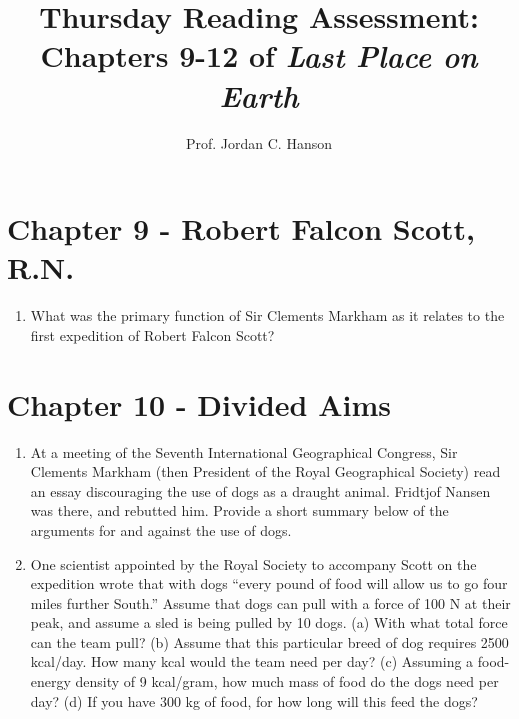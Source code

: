 \documentclass{article}
\begin{document}
\title{Thursday Reading Assessment: Chapters 9-12 of \textit{Last Place on Earth}}
\author{Prof. Jordan C. Hanson}

\maketitle

\section{Chapter 9 - Robert Falcon Scott, R.N.}

\begin{enumerate}
\item What was the primary function of Sir Clements Markham as it relates to the first expedition of Robert Falcon Scott? \\ \vspace{2cm}
\end{enumerate}

\section{Chapter 10 - Divided Aims}

\begin{enumerate}
\item At a meeting of the Seventh International Geographical Congress, Sir Clements Markham (then President of the Royal Geographical Society) read an essay discouraging the use of dogs as a draught animal.  Fridtjof Nansen was there, and rebutted him.  Provide a short summary below of the arguments for and against the use of dogs. \\ \vspace{4cm}
\item One scientist appointed by the Royal Society to accompany Scott on the expedition wrote that with dogs ``every pound of food will allow us to go four miles further South.''  Assume that dogs can pull with a force of 100 N at their peak, and assume a sled is being pulled by 10 dogs.  (a) With what total force can the team pull? (b) Assume that this particular breed of dog requires 2500 kcal/day.  How many kcal would the team need per day?  (c) Assuming a food-energy density of 9 kcal/gram, how much mass of food do the dogs need per day?  (d) If you have 300 kg of food, for how long will this feed the dogs? \\ \vspace{4cm}
\end{enumerate}
\clearpage
\end{document}
